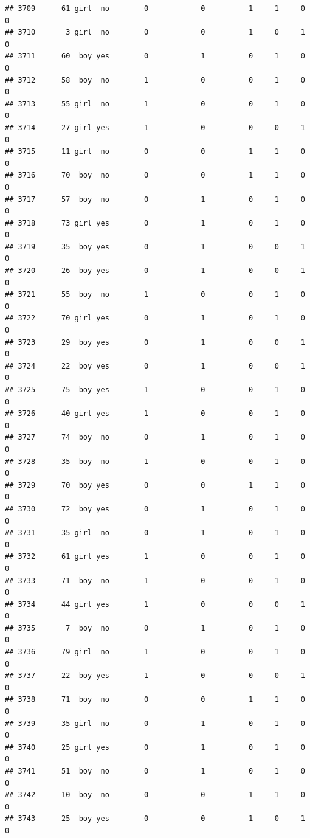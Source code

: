 \documentclass[man]{apa6}
\begin{document}
\begin{verbatim}
## 3709      61 girl  no        0            0          1     1     0     0
## 3710       3 girl  no        0            0          1     0     1     0
## 3711      60  boy yes        0            1          0     1     0     0
## 3712      58  boy  no        1            0          0     1     0     0
## 3713      55 girl  no        1            0          0     1     0     0
## 3714      27 girl yes        1            0          0     0     1     0
## 3715      11 girl  no        0            0          1     1     0     0
## 3716      70  boy  no        0            0          1     1     0     0
## 3717      57  boy  no        0            1          0     1     0     0
## 3718      73 girl yes        0            1          0     1     0     0
## 3719      35  boy yes        0            1          0     0     1     0
## 3720      26  boy yes        0            1          0     0     1     0
## 3721      55  boy  no        1            0          0     1     0     0
## 3722      70 girl yes        0            1          0     1     0     0
## 3723      29  boy yes        0            1          0     0     1     0
## 3724      22  boy yes        0            1          0     0     1     0
## 3725      75  boy yes        1            0          0     1     0     0
## 3726      40 girl yes        1            0          0     1     0     0
## 3727      74  boy  no        0            1          0     1     0     0
## 3728      35  boy  no        1            0          0     1     0     0
## 3729      70  boy yes        0            0          1     1     0     0
## 3730      72  boy yes        0            1          0     1     0     0
## 3731      35 girl  no        0            1          0     1     0     0
## 3732      61 girl yes        1            0          0     1     0     0
## 3733      71  boy  no        1            0          0     1     0     0
## 3734      44 girl yes        1            0          0     0     1     0
## 3735       7  boy  no        0            1          0     1     0     0
## 3736      79 girl  no        1            0          0     1     0     0
## 3737      22  boy yes        1            0          0     0     1     0
## 3738      71  boy  no        0            0          1     1     0     0
## 3739      35 girl  no        0            1          0     1     0     0
## 3740      25 girl yes        0            1          0     1     0     0
## 3741      51  boy  no        0            1          0     1     0     0
## 3742      10  boy  no        0            0          1     1     0     0
## 3743      25  boy yes        0            0          1     0     1     0

\end{verbatim}
\end{document}
